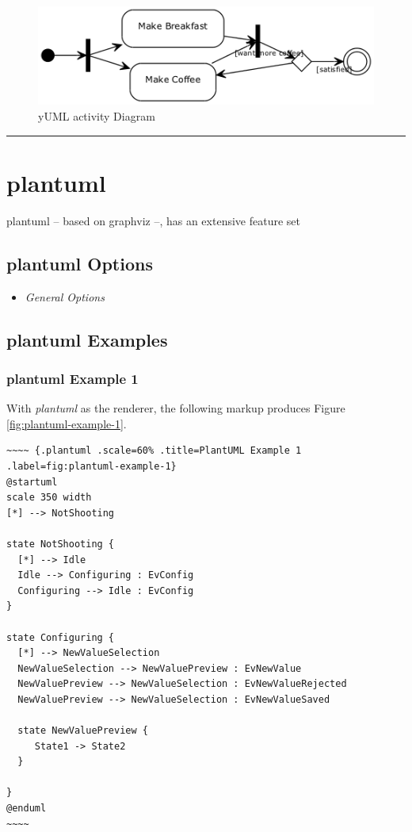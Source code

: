 \documentclass[]{article}
\begin{document}
\normalsize

\begin{figure}[htbp]
\centering
\includegraphics{tmp/ppp-render-_6_eB/image-8.png}
\caption{yUML activity Diagram\label{fig:yuml-activity-diagram}}
\end{figure}

\begin{center}\rule{3in}{0.4pt}\end{center}

\newpage

\section{plantuml}\label{plantuml}

plantuml -- based on graphviz --, has an extensive feature set

\subsection{plantuml Options}\label{plantuml-options}

\begin{itemize}
\itemsep1pt\parskip0pt
\item
  \emph{General Options}
\end{itemize}

\subsection{plantuml Examples}\label{plantuml-examples}

\subsubsection{plantuml Example 1}\label{plantuml-example-1}

With \emph{plantuml} as the renderer, the following markup produces
Figure \ref{fig:plantuml-example-1}.

\scriptsize

\begin{verbatim}
~~~~ {.plantuml .scale=60% .title=PlantUML Example 1 .label=fig:plantuml-example-1}
@startuml
scale 350 width
[*] --> NotShooting

state NotShooting {
  [*] --> Idle
  Idle --> Configuring : EvConfig
  Configuring --> Idle : EvConfig
}

state Configuring {
  [*] --> NewValueSelection
  NewValueSelection --> NewValuePreview : EvNewValue
  NewValuePreview --> NewValueSelection : EvNewValueRejected
  NewValuePreview --> NewValueSelection : EvNewValueSaved

  state NewValuePreview {
     State1 -> State2
  }

}
@enduml
~~~~
\end{verbatim}
\end{document}
